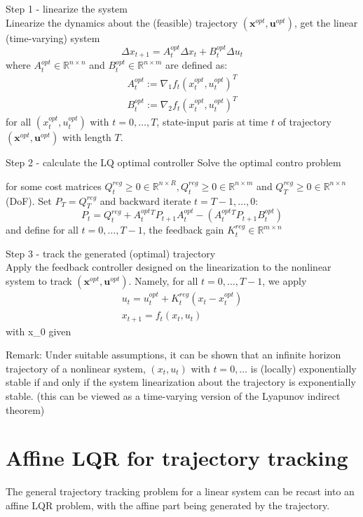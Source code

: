 \documentclass{book}
\newcommand{\R}{\mathbb{R}}
\theoremstyle{definition}
\theoremstyle{remark}
\theoremstyle{remark}
\begin{document}
Step 1 - linearize the system\\
Linearize the dynamics about the (feasible) trajectory $(\mathbf{x}^{opt},\mathbf{u}^{opt})$, get the linear (time-varying) system 
\[
    \Delta x_{t+1}=A_t^{opt}\Delta x_t+B_t^{opt}\Delta u_t
\]
where $A_t^{opt}\in \R^{n\times n}$ and $B_t^{opt}\in\R^{n\times m}$ are defined as: 
\begin{gather}
    A_t^{opt}:=\nabla_1f_t{(x_t^{opt},u_t^{opt})}^T \\
    B_t^{opt}:=\nabla_2f_t{(x_t^{opt},u_t^{opt})}^T
\end{gather}
for all $(x_t^{opt},u_t^{opt})$ with $t=0,\dots,T$, state-input paris at time $t$ of trajectory $(\mathbf{x}^{opt},\mathbf{u}^{opt})$ with length $T$.

Step 2 - calculate the LQ optimal controller
Solve the optimal contro problem %

for some cost matrices $Q_t^{reg}\geq 0 \in \R^{n\times R},Q_t^{reg}\geq 0 \in \R^{n\times m}$ and $Q_T^{reg}\geq 0 \in \R^{n\times n}$ (DoF). 
Set $P_T=Q_T^{reg}$ and backward iterate $t=T-1,\dots,0$: 
\[
    P_t=Q_t^{reg}+A_t^{opt}^T P_{t+1}A_t^{opt}-(A_t^{opt}^T P_{t+1}B_t^{opt}) %
\]
and define for all $t=0,\dots,T-1$, the feedback gain $K_t^{reg}\in\R^{m\times n}$

Step 3 - track the generated (optimal) trajectory\\
Apply the feedback controller designed on the linearization to the nonlinear system to track   $(\mathbf{x}^{opt},\mathbf{u}^{opt})$. Namely, for all $t=0,\dots,T-1$, we apply 
\begin{gather}
    u_t = u_t^{opt}+K_t^{reg}(x_t-x_t^{opt})\\ 
    x_{t+1} = f_t(x_t,u_t)
\end{gather}
with x_0 given

Remark: Under suitable assumptions, it can be shown that an infinite horizon trajectory of a nonlinear system, $(x_t,u_t)$ with $t=0,\dots$ is (locally) exponentially stable if and only if the system linearization about the trajectory is exponentially stable. (this can be viewed as a time-varying version of the Lyapunov indirect theorem)


\section{Affine LQR for trajectory tracking}
The general trajectory tracking problem for a linear system can be recast into an affine LQR problem, with the affine part being generated by the trajectory.
\end{document}
